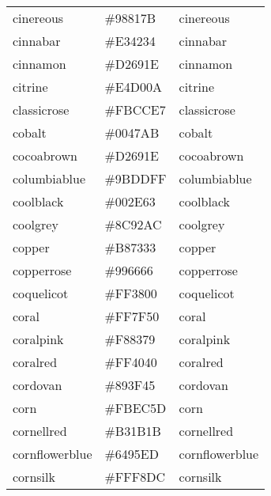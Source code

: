 \documentclass[
]{article}
\begin{document}
\begin{longtable}[]{@{}lll@{}}
cinereous & \colorbox[rgb]{0.6,0.51,0.48}{\#98817B} &
\textcolor[rgb]{0.6,0.51,0.48}{cinereous             }\tabularnewline
cinnabar & \colorbox[rgb]{0.89,0.26,0.2}{\#E34234} &
\textcolor[rgb]{0.89,0.26,0.2}{cinnabar              }\tabularnewline
cinnamon & \colorbox[rgb]{0.82,0.41,0.12}{\#D2691E} &
\textcolor[rgb]{0.82,0.41,0.12}{cinnamon              }\tabularnewline
citrine & \colorbox[rgb]{0.89,0.82,0.04}{\#E4D00A} &
\textcolor[rgb]{0.89,0.82,0.04}{citrine               }\tabularnewline
classicrose & \colorbox[rgb]{0.98,0.8,0.91}{\#FBCCE7} &
\textcolor[rgb]{0.98,0.8,0.91}{classicrose           }\tabularnewline
cobalt & \colorbox[rgb]{0.0,0.28,0.67}{\#0047AB} &
\textcolor[rgb]{0.0,0.28,0.67}{cobalt                }\tabularnewline
cocoabrown & \colorbox[rgb]{0.82,0.41,0.12}{\#D2691E} &
\textcolor[rgb]{0.82,0.41,0.12}{cocoabrown            }\tabularnewline
columbiablue & \colorbox[rgb]{0.61,0.87,1.0}{\#9BDDFF} &
\textcolor[rgb]{0.61,0.87,1.0}{columbiablue          }\tabularnewline
coolblack & \colorbox[rgb]{0.0,0.18,0.39}{\#002E63} &
\textcolor[rgb]{0.0,0.18,0.39}{coolblack             }\tabularnewline
coolgrey & \colorbox[rgb]{0.55,0.57,0.67}{\#8C92AC} &
\textcolor[rgb]{0.55,0.57,0.67}{coolgrey              }\tabularnewline
copper & \colorbox[rgb]{0.72,0.45,0.2}{\#B87333} &
\textcolor[rgb]{0.72,0.45,0.2}{copper                }\tabularnewline
copperrose & \colorbox[rgb]{0.6,0.4,0.4}{\#996666} &
\textcolor[rgb]{0.6,0.4,0.4}{copperrose            }\tabularnewline
coquelicot & \colorbox[rgb]{1.0,0.22,0.0}{\#FF3800} &
\textcolor[rgb]{1.0,0.22,0.0}{coquelicot            }\tabularnewline
coral & \colorbox[rgb]{1.0,0.5,0.31}{\#FF7F50} &
\textcolor[rgb]{1.0,0.5,0.31}{coral                 }\tabularnewline
coralpink & \colorbox[rgb]{0.97,0.51,0.47}{\#F88379} &
\textcolor[rgb]{0.97,0.51,0.47}{coralpink             }\tabularnewline
coralred & \colorbox[rgb]{1.0,0.25,0.25}{\#FF4040} &
\textcolor[rgb]{1.0,0.25,0.25}{coralred              }\tabularnewline
cordovan & \colorbox[rgb]{0.54,0.25,0.27}{\#893F45} &
\textcolor[rgb]{0.54,0.25,0.27}{cordovan              }\tabularnewline
corn & \colorbox[rgb]{0.98,0.93,0.36}{\#FBEC5D} &
\textcolor[rgb]{0.98,0.93,0.36}{corn                  }\tabularnewline
cornellred & \colorbox[rgb]{0.7,0.11,0.11}{\#B31B1B} &
\textcolor[rgb]{0.7,0.11,0.11}{cornellred            }\tabularnewline
cornflowerblue & \colorbox[rgb]{0.39,0.58,0.93}{\#6495ED} &
\textcolor[rgb]{0.39,0.58,0.93}{cornflowerblue        }\tabularnewline
cornsilk & \colorbox[rgb]{1.0,0.97,0.86}{\#FFF8DC} &
\textcolor[rgb]{1.0,0.97,0.86}{cornsilk              }\tabularnewline

\end{longtable}
\end{document}
